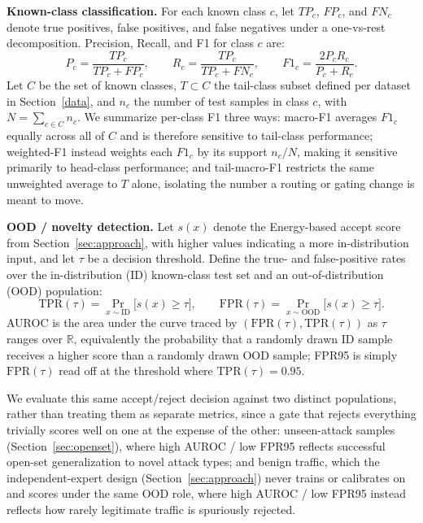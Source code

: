 \documentclass[sigconf]{acmart}
\begin{document}
\textbf{Known-class classification.} For each known class $c$, let $TP_c$, $FP_c$, and $FN_c$ denote true positives, false positives, and false negatives under a one-vs-rest decomposition. Precision, Recall, and F1 for class $c$ are:
\begin{equation}
P_c = \frac{TP_c}{TP_c + FP_c}, \qquad R_c = \frac{TP_c}{TP_c + FN_c}, \qquad F1_c = \frac{2 P_c R_c}{P_c + R_c}.
\end{equation}
Let $C$ be the set of known classes, $T \subset C$ the tail-class subset defined per dataset in Section~\ref{data}, and $n_c$ the number of test samples in class $c$, with $N = \sum_{c \in C} n_c$. We summarize per-class F1 three ways: macro-F1 averages $F1_c$ equally across all of $C$ and is therefore sensitive to tail-class performance; weighted-F1 instead weights each $F1_c$ by its support $n_c / N$, making it sensitive primarily to head-class performance; and tail-macro-F1 restricts the same unweighted average to $T$ alone, isolating the number a routing or gating change is meant to move.

\textbf{OOD / novelty detection.} Let $s(x)$ denote the Energy-based accept score from Section~\ref{sec:approach}, with higher values indicating a more in-distribution input, and let $\tau$ be a decision threshold. Define the true- and false-positive rates over the in-distribution (ID) known-class test set and an out-of-distribution (OOD) population:
\begin{equation}
\text{TPR}(\tau) = \Pr_{x \sim \text{ID}}\big[s(x) \geq \tau\big], \qquad \text{FPR}(\tau) = \Pr_{x \sim \text{OOD}}\big[s(x) \geq \tau\big].
\end{equation}
AUROC is the area under the curve traced by $(\text{FPR}(\tau), \text{TPR}(\tau))$ as $\tau$ ranges over $\mathbb{R}$, equivalently the probability that a randomly drawn ID sample receives a higher score than a randomly drawn OOD sample; FPR95 is simply $\text{FPR}(\tau)$ read off at the threshold where $\text{TPR}(\tau) = 0.95$.

We evaluate this same accept/reject decision against two distinct populations, rather than treating them as separate metrics, since a gate that rejects everything trivially scores well on one at the expense of the other: unseen-attack samples (Section~\ref{sec:openset}), where high AUROC / low FPR95 reflects successful open-set generalization to novel attack types; and benign traffic, which the independent-expert design (Section~\ref{sec:approach}) never trains or calibrates on and scores under the same OOD role, where high AUROC / low FPR95 instead reflects how rarely legitimate traffic is spuriously rejected.
\end{document}
